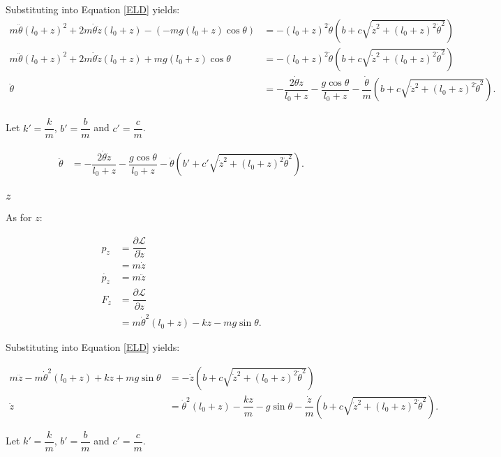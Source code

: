 \documentclass[12pt,a4paper,portrait]{article}
\begin{document}
Substituting into Equation \eqref{ELD} yields:
\begin{align*}
	m\ddot{\theta} (l_0+z)^2 + 2m\dot{\theta}\dot{z}(l_0+z) - (-mg(l_0+z)\cos{\theta}) &= -(l_0+z)^2 \dot{\theta} \left(b+c\sqrt{\dot{z}^2+(l_0+z)^2\dot{\theta}^2}\right) \\
	m\ddot{\theta} (l_0+z)^2 + 2m\dot{\theta}\dot{z}(l_0+z) +mg(l_0+z)\cos{\theta} &= -(l_0+z)^2 \dot{\theta} \left(b+c\sqrt{\dot{z}^2+(l_0+z)^2\dot{\theta}^2}\right) \\
	\ddot{\theta} &= -\dfrac{2\dot{\theta}\dot{z}}{l_0+z} - \dfrac{g\cos{\theta}}{l_0+z} -\dfrac{\dot{\theta}}{m} \left(b+c\sqrt{\dot{z}^2+(l_0+z)^2\dot{\theta}^2}\right). \\
\end{align*}

Let $k'=\dfrac{k}{m}$, $b'=\dfrac{b}{m}$ and $c'=\dfrac{c}{m}$.

\begin{align*}
	\ddot{\theta} &= -\dfrac{2\dot{\theta}\dot{z}}{l_0+z} - \dfrac{g\cos{\theta}}{l_0+z} -\dot{\theta} \left(b'+c'\sqrt{\dot{z}^2+(l_0+z)^2\dot{\theta}^2}\right).
\end{align*}

\subsubsection{$z$}
As for $z$:

\begin{align*}
	p_z &= \dfrac{\partial \mathcal{L}}{\partial \dot{z}} \\
	&= m\dot{z} \\
	\dot{p_z} &= m\ddot{z} \\
	F_z &= \dfrac{\partial \mathcal{L}}{\partial z} \\
	&= m\dot{\theta}^2(l_0+z) - kz - mg\sin{\theta}.
\end{align*}

Substituting into Equation \eqref{ELD} yields:

\begin{align*}
	m\ddot{z} - m\dot{\theta}^2(l_0+z) + kz + mg\sin{\theta} &= -\dot{z}\left(b+c\sqrt{\dot{z}^2+(l_0+z)^2\dot{\theta}^2}\right) \\
	\ddot{z} &= \dot{\theta}^2(l_0+z) - \dfrac{kz}{m} - g\sin{\theta} -\dfrac{\dot{z}}{m}\left(b+c\sqrt{\dot{z}^2+(l_0+z)^2\dot{\theta}^2}\right).
\end{align*}

Let $k'=\dfrac{k}{m}$, $b'=\dfrac{b}{m}$ and $c'=\dfrac{c}{m}$.
\end{document}
